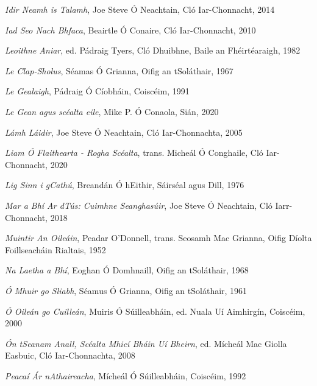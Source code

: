 \documentclass[output=paper,colorlinks,citecolor=brown]{langscibook}
\begin{document}
\begin{description}[leftmargin=!,labelwidth=\widthof{\textsc{agmts:}},font=\normalfont\scshape,noitemsep]
\item[init:]  \textit{Idir Neamh is Talamh}, Joe Steve Ó Neachtain, Cló Iar-Chonnacht, 2014             
\item[isnb:]  \textit{Iad Seo Nach Bhfaca}, Beairtle Ó Conaire,  Cló Iar-Chonnacht, 2010               
\item[lan:]    \textit{Leoithne Aniar},  ed. Pádraig Tyers, Cló Dhuibhne, Baile an Fhéirtéaraigh, 1982  
\item[lcs:]  \textit{Le Clap-Sholus},  Séamas Ó Grianna, Oifig an tSoláthair, 1967                    
\item[lgl:]  \textit{Le Gealaigh}, Pádraig Ó Cíobháin, Coiscéim, 1991                                 
\item[lgn:]  \textit{Le Gean agus scéalta eile}, Mike P. Ó Conaola, Sián, 2020                        
\item[ll:]  \textit{Lámh Láidir}, Joe Steve Ó Neachtain, Cló Iar-Chonnachta,  2005                   
\item[lofrs:] \textit{Liam Ó Flaithearta - Rogha Scéalta}, trans. Micheál Ó Conghaile, Cló 
                    Iar-Chonnacht, 2020                                                                       
\item[lsc:] \textit{Lig Sinn i gCathú},  Breandán Ó hEithir, Sáirséal agus Dill, 1976                 
\item[mabat:]  \textit{Mar a Bhí Ar dTús: Cuimhne Seanghasúir}, Joe Steve Ó Neachtain, Cló 
                      Iarr-Chonnacht, 2018                                                                    
\item[mo:]  \textit{Muintir An Oileáin},  Peadar O'Donnell, trans. Seosamh Mac Grianna,  Oifig Díolta
                      Foillseacháin Rialtais, 1952                                                            
\item[nlab:]  \textit{Na Laetha a Bhí},  Eoghan Ó Domhnaill, Oifig an tSoláthair, 1968                 
\item[omgs:]  \textit{Ó Mhuir go Sliabh}, Séamus Ó Grianna, Oifig an tSoláthair, 1961                  
\item[oogc:]  \textit{Ó Oileán go Cuilleán}, Muiris Ó Súilleabháin, ed. Nuala Uí Aimhirgín, Coiscéim, 2000 
\item[ota:]  \textit{Ón tSeanam Anall, Scéalta Mhicí Bháin Uí Bheirn}, ed. Mícheál Mac Giolla Easbuic,
                      Cló Iar-Chonnachta, 2008                                                               
\item[paa:]  \textit{Peacaí Ár nAthaireacha}, Mícheál Ó Súilleabháin, Coiscéim, 1992                  

\end{description}
\end{document}
